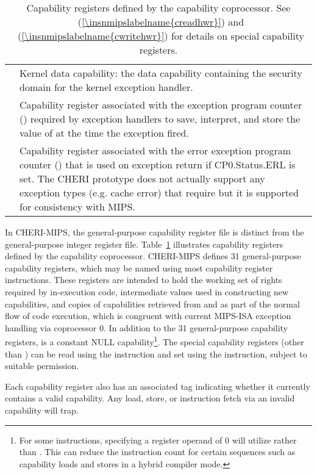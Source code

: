 \begin{table}
\begin{center}
\begin{tabular}{lp{11cm}}
  \KDC{} & Kernel data capability: the data capability containing the security
  domain for the kernel exception handler.  \\
  \EPCC{} & Capability register associated with the exception program counter
  (\EPC{}) required by exception handlers to save, interpret, and store the
  value of \PCC{} at the time the exception fired.\\
  \ErrorEPCC{} & Capability register associated with the error exception program counter
  (\ErrorEPC{}) that is used on exception return if CP0.Status.ERL is set. The CHERI prototype
  does not actually support any exception types (e.g. cache error) that require \ErrorEPC{} but
  it is supported for consistency with MIPS. \\
\bottomrule
\end{tabular}
\end{center}
\label{table:capability-registers}
\caption{Capability registers defined by the capability coprocessor. See
~(\ref{\insnmipslabelname{creadhwr}}) and
~(\ref{\insnmipslabelname{cwritehwr}}) for details
on special capability registers.}
\end{table}

In CHERI-MIPS, the general-purpose capability register file is distinct from
the general-purpose integer register file.
Table~\ref{table:capability-registers} illustrates capability registers
defined by the capability coprocessor.
CHERI-MIPS defines 31 general-purpose capability registers, which may be named using
most capability register instructions.
These registers are intended to hold the working set of rights required by in-execution
code, intermediate values used in constructing new capabilities, and copies of capabilities
retrieved from \EPCC{} and \PCC{} as part of the normal flow of code execution, which is congruent with current MIPS-ISA exception handling via coprocessor 0.
In addition to the 31 general-purpose capability registers,  is a constant NULL capability\footnote{For some instructions, specifying a register operand of 0 will utilize \DDC{} rather than . This can reduce the instruction count for certain sequences such as capability loads and stores in a hybrid compiler mode.}.
The special capability registers (other than \PCC) can be read using the  instruction and set using the  instruction, subject to suitable permission.

Each capability register also has an associated tag indicating whether it
currently contains a valid capability.  Any load, store, or instruction
fetch via an invalid capability will trap.

